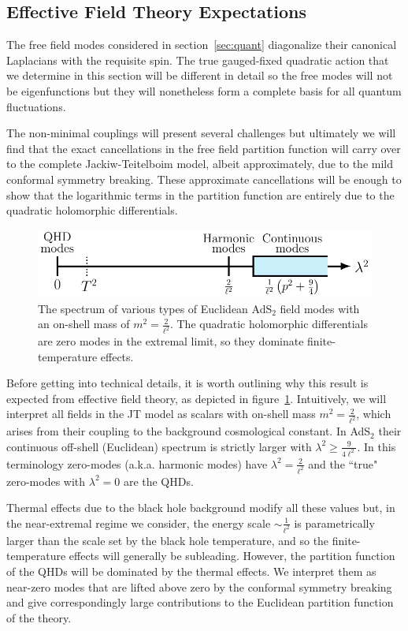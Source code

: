 \documentclass[12pt]{article}
\begin{document}
\subsection{Effective Field Theory Expectations}
\label{sec:EFTE}
The free field modes considered in section~\ref{sec:quant} diagonalize their canonical Laplacians with the requisite spin. 
The true gauged-fixed quadratic action that we determine in this section will be different in detail so the free modes will not be eigenfunctions
but they will nonetheless form a complete basis for all quantum fluctuations.  

The non-minimal couplings will present several challenges but ultimately we will find that the exact cancellations in the free field partition function 
will carry over to the complete Jackiw-Teitelboim model, albeit approximately, due to the mild conformal symmetry breaking.  These approximate cancellations will be enough to show that the logarithmic terms in the partition function are entirely due to the quadratic holomorphic differentials.

\begin{figure}[ht]\centering
	\includegraphics[scale = 0.8]{Images/whyjt3.pdf}
	\caption{The spectrum of various types of Euclidean AdS$_2$ field modes with an on-shell mass of $m^2 = \frac{2}{\ell^2}$.  The quadratic holomorphic differentials are zero modes in the extremal limit, so they dominate finite-temperature effects.}
	\label{fig:scales2}
\end{figure}

Before getting into technical details, it is worth outlining why this result is expected from effective field theory,  as depicted in figure~\ref{fig:scales2}. Intuitively, we will interpret all fields in the JT model as scalars with on-shell mass $m^2 = \frac{2}{\ell^2}$, which arises from their coupling to the background cosmological constant. 
In AdS$_2$ their continuous off-shell (Euclidean) spectrum is strictly larger with $\lambda^2\geq \frac{9}{4\ell^2}$. In this terminology zero-modes (a.k.a. harmonic modes) have $\lambda^2=\frac{2}{\ell^2}$ and the ``true" zero-modes with $\lambda^2=0$ are the QHDs. 

Thermal effects due to the black hole background modify all these values but,
in the near-extremal regime we consider, the energy scale $\sim \frac{1}{\ell^2}$ is parametrically larger than the scale set by the black hole temperature, and so the finite-temperature effects will generally be subleading.  However, the partition function of the QHDs will be dominated by the thermal effects. We interpret them 
as near-zero modes that are lifted above zero by the conformal symmetry breaking and give correspondingly large contributions to the Euclidean partition function of the theory.
\end{document}
